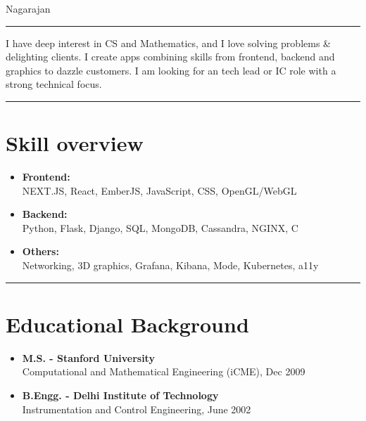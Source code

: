 \documentclass[line, 11pt]{res}
\renewenvironment{resume}{\begingroup}{\endgroup}
\begin{document}
{\huge Nagarajan} %


\begin{resume}

\vspace{5pt}
\hrule
\vspace{-5pt}
I have deep interest in CS and Mathematics, and I love solving problems \& delighting clients. I create apps combining skills from frontend, backend and graphics to dazzle customers. I am looking for an tech lead or IC role with a strong technical focus.

\vspace{8pt}
\hrule

\vspace{-7pt}
\section{Skill overview}
    \begin{itemize}
        \item \textbf{Frontend: } \\
        NEXT{\tiny.JS}, React, EmberJS, JavaScript, CSS, OpenGL/WebGL
        \item \textbf{Backend: } \\
        Python, Flask, Django, SQL, MongoDB, Cassandra, NGINX, C
        \item \textbf{Others: } \\
        Networking, 3D graphics, Grafana, Kibana, Mode, Kubernetes, a11y
    \end{itemize}

\vspace{5pt}
\hrule

\vspace{-7pt}
\section{Educational Background}
    \begin{itemize}
        \item \textbf{M.S. - Stanford University} \\
        Computational and Mathematical Engineering (iCME), Dec 2009
        \item \textbf{B.Engg. - Delhi Institute of Technology} \\ Instrumentation and Control Engineering, June 2002 \\
    \end{itemize}


\end{resume}
\end{document}
